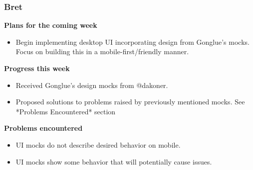 \documentclass[10pt, onecolumn, draftclsnofoot, letterpaper, compsoc]{IEEEtran}
\begin{document}
    \subsubsection{Bret}

    \noindent \textbf{Plans for the coming week}

    \begin{itemize}

    \item Begin implementing desktop UI incorporating design from Gonglue's mocks. Focus on building this in a
      mobile-first/friendly manner.

    \end{itemize}

    \noindent \textbf{Progress this week}

    \begin{itemize}

    \item Received Gonglue's design mocks from @dakoner.
    \item Proposed solutions to problems raised by previously mentioned mocks. See *Problems Encountered* section

    \end{itemize}

    \noindent \textbf{Problems encountered}

    \begin{itemize}

    \item UI mocks do not describe desired behavior on mobile.
    \item UI mocks show some behavior that will potentially cause issues.

    \end{itemize}
\end{document}
